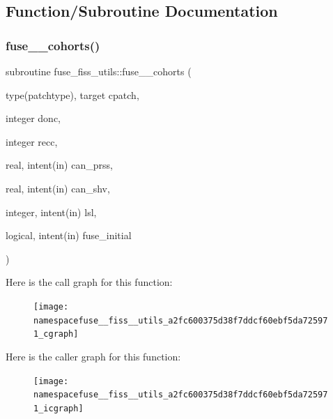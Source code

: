 \subsection{Function/\+Subroutine Documentation}
\mbox{\label{namespacefuse__fiss__utils_a2fc600375d38f7ddcf60ebf5da725971}} 
\subsubsection{\texorpdfstring{fuse\+\_\+\_\+cohorts()}{fuse\_2\_cohorts()}}
{\footnotesize\ttfamily subroutine fuse\+\_\+fiss\+\_\+utils\+::fuse\+\_\+\_\+cohorts (\begin{DoxyParamCaption}\item[{type(patchtype), target}]{cpatch,  }\item[{integer}]{donc,  }\item[{integer}]{recc,  }\item[{real, intent(in)}]{can\+\_\+prss,  }\item[{real, intent(in)}]{can\+\_\+shv,  }\item[{integer, intent(in)}]{lsl,  }\item[{logical, intent(in)}]{fuse\+\_\+initial }\end{DoxyParamCaption})}

Here is the call graph for this function\+:
\nopagebreak
\begin{figure}[H]
\begin{center}
\leavevmode
\texttt{[image: namespacefuse\_\_fiss\_\_utils\_a2fc600375d38f7ddcf60ebf5da725971\_cgraph]}
\end{center}
\end{figure}
Here is the caller graph for this function\+:
\nopagebreak
\begin{figure}[H]
\begin{center}
\leavevmode
\texttt{[image: namespacefuse\_\_fiss\_\_utils\_a2fc600375d38f7ddcf60ebf5da725971\_icgraph]}
\end{center}
\end{figure}
\mbox{\label{namespacefuse__fiss__utils_ad3a8f1f374137c79a74aed4b42bca8a9}} 
